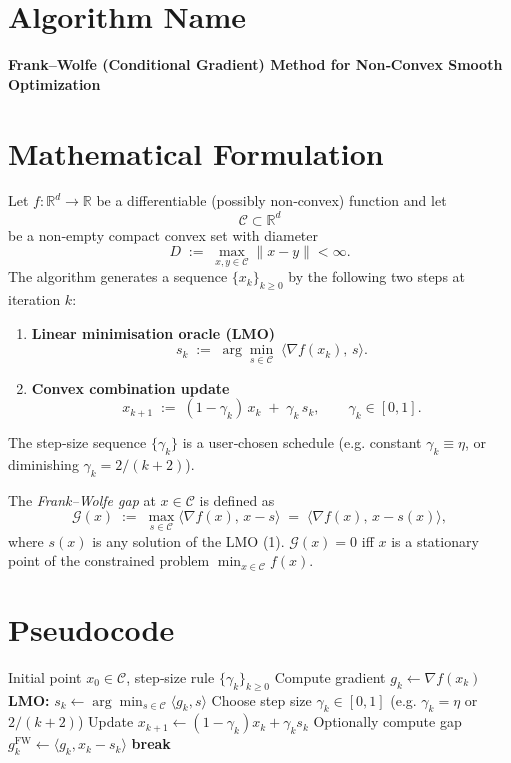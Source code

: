 \documentclass{article}
\newcommand{\R}{\mathbb{R}}
\begin{document}
\section*{Algorithm Name}
\textbf{Frank–Wolfe (Conditional Gradient) Method for Non‑Convex Smooth Optimization}

\section*{Mathematical Formulation}
Let $f:\R^{d}\rightarrow\R$ be a differentiable (possibly non‑convex) function and let 
\[
\mathcal C\subset\R^{d}
\]
be a non‑empty compact convex set with diameter 
\[
D\;:=\;\max_{x,y\in\mathcal C}\|x-y\|<\infty .
\]
The algorithm generates a sequence $\{x_k\}_{k\ge 0}$ by the following two steps at iteration $k$:

\begin{enumerate}[label=\arabic*.]
\item \textbf{Linear minimisation oracle (LMO)}  
\[
s_k \;:=\; \arg\min_{s\in\mathcal C}\;\langle \nabla f(x_k),\,s\rangle .
\tag{1}
\]
\item \textbf{Convex combination update}  
\[
x_{k+1}\;:=\;(1-\gamma_k)\,x_k\;+\;\gamma_k\,s_k ,\qquad 
\gamma_k\in[0,1] .
\tag{2}
\]
\end{enumerate}
The step‑size sequence $\{\gamma_k\}$ is a user‑chosen schedule (e.g. constant $\gamma_k\equiv\eta$, or diminishing $\gamma_k=2/(k+2)$).

The \emph{Frank–Wolfe gap} at $x\in\mathcal C$ is defined as
\[
\mathcal G(x)\;:=\;\max_{s\in\mathcal C}\langle \nabla f(x),\,x-s\rangle
   \;=\;\langle \nabla f(x),\,x-s(x)\rangle ,
\tag{3}
\]
where $s(x)$ is any solution of the LMO (1).  $\mathcal G(x)=0$ iff $x$ is a stationary point of the constrained problem $\min_{x\in\mathcal C}f(x)$.

\section*{Pseudocode}
\begin{algorithm}[H]
\caption{Frank–Wolfe for non‑convex smooth $f$}
\begin{algorithmic}[1]
\Require Initial point $x_0\in\mathcal C$, step‑size rule $\{\gamma_k\}_{k\ge0}$
    \State Compute gradient $g_k\gets \nabla f(x_k)$
    \State \textbf{LMO:} $s_k \gets \arg\min_{s\in\mathcal C}\langle g_k,s\rangle$   
    \State Choose step size $\gamma_k\in[0,1]$ (e.g. $\gamma_k=\eta$ or $2/(k+2)$)
    \State Update $x_{k+1}\gets (1-\gamma_k)x_k+\gamma_k s_k$                     
    \State Optionally compute gap $g_k^{\text{FW}}\gets\langle g_k,x_k-s_k\rangle$
        \State \textbf{break}
    \EndIf
\EndFor
\end{algorithmic}
\end{algorithm}
\end{document}

